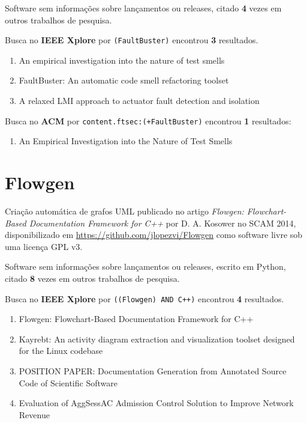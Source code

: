 Software sem informações sobre lançamentos ou releases,
citado {\bf 4} vezes em outros trabalhos de pesquisa.

Busca no {\bf IEEE Xplore} por
\texttt{(FaultBuster)}
encontrou {\bf 3}
resultados.

\begin{enumerate}
\item An empirical investigation into the nature of test smells
\item FaultBuster: An automatic code smell refactoring toolset
\item A relaxed LMI approach to actuator fault detection and isolation
\end{enumerate}

Busca no {\bf ACM} por
\texttt{content.ftsec:(+FaultBuster)}
encontrou {\bf 1}
resultados:

\begin{enumerate}
\item An Empirical Investigation into the Nature of Test Smells
\end{enumerate}

\section{Flowgen}

Criação automática de grafos UML
publicado no artigo {\it Flowgen: Flowchart-Based Documentation Framework for C++}
por D. A. Kosower
no SCAM 2014,
disponibilizado em \url{https://github.com/jlopezvi/Flowgen}
como software livre
sob uma licença GPL v3.

Software sem informações sobre lançamentos ou releases,
escrito em Python,
citado {\bf 8} vezes em outros trabalhos de pesquisa.

Busca no {\bf IEEE Xplore} por
\texttt{((Flowgen) AND C++)}
encontrou {\bf 4}
resultados.

\begin{enumerate}
\item Flowgen: Flowchart-Based Documentation Framework for C++
\item Kayrebt: An activity diagram extraction and visualization toolset designed for the Linux codebase
\item POSITION PAPER: Documentation Generation from Annotated Source Code of Scientific Software
\item Evaluation of AggSessAC Admission Control Solution to Improve Network Revenue
\end{enumerate}


